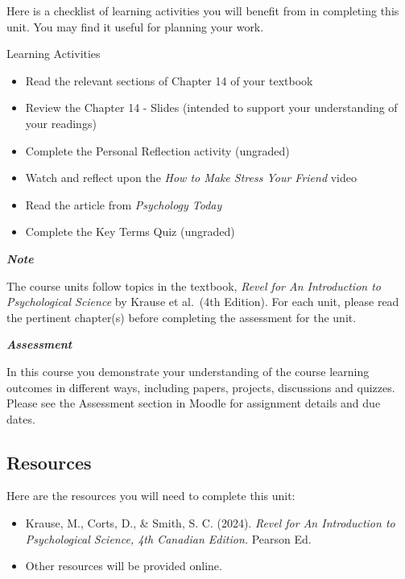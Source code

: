 \documentclass[
]{book}
\providecommand{\tightlist}{%
  \setlength{\itemsep}{0pt}\setlength{\parskip}{0pt}}
\begin{document}
Here is a checklist of learning activities you will benefit from in completing this unit. You may find it useful for planning your work.

\begin{reflect}
{Learning Activities}

\begin{itemize}
\tightlist
\item
  Read the relevant sections of Chapter 14 of your textbook
\item
  Review the Chapter 14 - Slides (intended to support your understanding of your readings)
\item
  Complete the Personal Reflection activity (ungraded)
\item
  Watch and reflect upon the \emph{How to Make Stress Your Friend} video
\item
  Read the article from \emph{Psychology Today}
\item
  Complete the Key Terms Quiz (ungraded)
\end{itemize}
\end{reflect}

\begin{caution}
\textbf{\emph{Note}}

The course units follow topics in the textbook, \emph{Revel for An Introduction to Psychological Science} by Krause et al.~(4th Edition). For each unit, please read the pertinent chapter(s) before completing the assessment for the unit.
\end{caution}

\begin{assessment}
\textbf{\emph{Assessment}}

In this course you demonstrate your understanding of the course learning outcomes in different ways, including papers, projects, discussions and quizzes. Please see the Assessment section in Moodle for assignment details and due dates.
\end{assessment}

\hypertarget{resources-8}{%
\subsection*{Resources}\label{resources-8}}

Here are the resources you will need to complete this unit:

\begin{itemize}
\tightlist
\item
  Krause, M., Corts, D., \& Smith, S. C. (2024). \emph{Revel for An Introduction to Psychological Science, 4th Canadian Edition.} Pearson Ed.
\item
  Other resources will be provided online.
\end{itemize}
\end{document}
